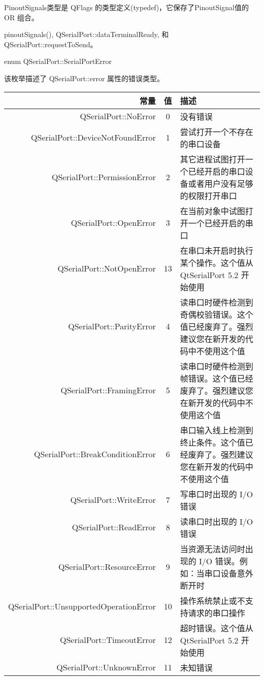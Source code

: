 PinoutSignals类型是 QFlags 的类型定义(typedef)，它保存了PinoutSignal值的 OR 组合。

\begin{seeAlso}
pinoutSignals(), QSerialPort::dataTerminalReady, 和 QSerialPort::requestToSend。
\end{seeAlso}

enum QSerialPort::SerialPortError

该枚举描述了 QSerialPort::error 属性的错误类型。

\begin{longtable}[l]{|r|c|m{9em}|}
	\hline
	常量	&值&	描述 \\ 
	\hline 
	QSerialPort::NoError &	0 &	没有错误 \\ 
	\hline
	QSerialPort::DeviceNotFoundError &	1 &	尝试打开一个不存在的串口设备 \\ 
	\hline
	QSerialPort::PermissionError 	&2 	&其它进程试图打开一个已经开启的串口设备或者用户没有足够的权限打开串口 \\ 
	\hline
	QSerialPort::OpenError &	3& 	在当前对象中试图打开一个已经开启的串口 \\ 
	\hline
	QSerialPort::NotOpenError 	&13 &	在串口未开启时执行某个操作。这个值从 QtSerialPort 5.2 开始使用 \\
	\hline 
	QSerialPort::ParityError &	4 &	读串口时硬件检测到奇偶校验错误。这个值已经废弃了。强烈建议您在新开发的代码中不使用这个值 \\ 
	\hline
	QSerialPort::FramingError &	5 &	读串口时硬件检测到帧错误。这个值已经废弃了。强烈建议您在新开发的代码中不使用这个值 \\ 
	\hline
	QSerialPort::BreakConditionError &	6 &	串口输入线上检测到终止条件。这个值已经废弃了。强烈建议您在新开发的代码中不使用这个值 \\ 
	\hline
	QSerialPort::WriteError &	7 	&写串口时出现的 I/O 错误 \\ 
	\hline
	QSerialPort::ReadError &	8 &	读串口时出现的 I/O 错误 \\ 
\hline
	QSerialPort::ResourceError 	&9 	&当资源无法访问时出现的 I/O 错误。例如：当串口设备意外断开时 \\ 
	\hline
	QSerialPort::UnsupportedOperationError& 	10 &	操作系统禁止或不支持请求的串口操作 \\ 
	\hline
	QSerialPort::TimeoutError 	&12 &	超时错误。这个值从 QtSerialPort 5.2 开始使用 \\ 
	\hline
	QSerialPort::UnknownError &	11 &	未知错误 \\ 
	\hline
\end{longtable}



